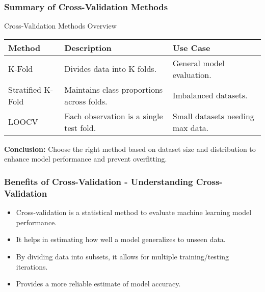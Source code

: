 \documentclass[aspectratio=169]{beamer}
\begin{document}
\begin{frame}[fragile]
    \frametitle{Summary of Cross-Validation Methods}
    \begin{block}{Cross-Validation Methods Overview}
        \begin{tabular}{|l|l|l|}
            \hline
            \textbf{Method}              & \textbf{Description}                            & \textbf{Use Case}                    \\
            \hline
            K-Fold                       & Divides data into K folds.                    & General model evaluation.            \\
            \hline
            Stratified K-Fold            & Maintains class proportions across folds.     & Imbalanced datasets.                 \\
            \hline
            LOOCV                        & Each observation is a single test fold.       & Small datasets needing max data.     \\
            \hline
        \end{tabular}
    \end{block}

    \textbf{Conclusion:} Choose the right method based on dataset size and distribution to enhance model performance and prevent overfitting.
\end{frame}

\begin{frame}[fragile]
    \frametitle{Benefits of Cross-Validation - Understanding Cross-Validation}
    \begin{itemize}
        \item Cross-validation is a statistical method to evaluate machine learning model performance.
        \item It helps in estimating how well a model generalizes to unseen data.
        \item By dividing data into subsets, it allows for multiple training/testing iterations.
        \item Provides a more reliable estimate of model accuracy.
    \end{itemize}
\end{frame}
\end{document}
